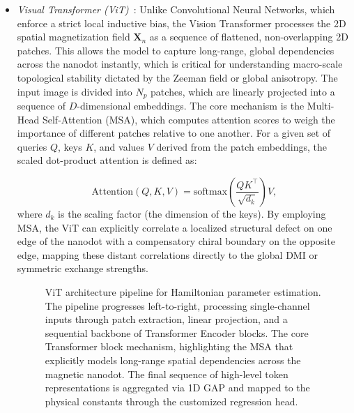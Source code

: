 \documentclass[final,5p,times,twocolumn]{elsarticle}
\begin{document}
\begin{itemize}
\begin{figure}[t!]
    \centering
    \resizebox{\linewidth}{!}{
    }
\caption{Xception architecture pipeline for Hamiltonian parameter estimation. The feature extractor composed of Entry, Middle, and Exit flows. A detailed horizontal view illustrates the depthwise separable convolution mechanism where spatial feature extraction (depthwise) and cross-channel correlations (pointwise) are entirely decoupled. The final aggregated features are mapped to physical constants.}\label{fig:xception_implementation}
\end{figure}



\item[--] \emph{Visual Transformer (ViT)}~\cite{dosovitskiy2020image}: Unlike Convolutional Neural Networks, which enforce a strict local inductive bias, the Vision Transformer processes the 2D spatial magnetization field $\mathbf{X}_n$ as a sequence of flattened, non-overlapping 2D patches. This allows the model to capture long-range, global dependencies across the nanodot instantly, which is critical for understanding macro-scale topological stability dictated by the Zeeman field or global anisotropy. The input image is divided into $N_p$ patches, which are linearly projected into a sequence of $D$-dimensional embeddings. The core mechanism is the Multi-Head Self-Attention (MSA), which computes attention scores to weigh the importance of different patches relative to one another. For a given set of queries $Q$, keys $K$, and values $V$ derived from the patch embeddings, the scaled dot-product attention is defined as:

\begin{equation}\label{eq:ViT}
\text{Attention}(Q, K, V) = \text{softmax}\left(\frac{QK^\top}{\sqrt{d_k}}\right)V,
\end{equation}
where $d_k$ is the scaling factor (the dimension of the keys). By employing MSA, the ViT can explicitly correlate a localized structural defect on one edge of the nanodot with a compensatory chiral boundary on the opposite edge, mapping these distant correlations directly to the global DMI or symmetric exchange strengths.

\begin{figure}[t!]
    \centering
    \resizebox{\linewidth}{!}{
    }
\caption{ViT architecture pipeline for Hamiltonian parameter estimation. The pipeline progresses left-to-right, processing single-channel inputs through patch extraction, linear projection, and a sequential backbone of Transformer Encoder blocks. The core Transformer block mechanism, highlighting the MSA that explicitly models long-range spatial dependencies across the magnetic nanodot. The final sequence of high-level token representations is aggregated via 1D GAP and mapped to the physical constants through the customized regression head.}
\label{fig:vit_implementation}
\end{figure}



\end{itemize}
\end{document}
